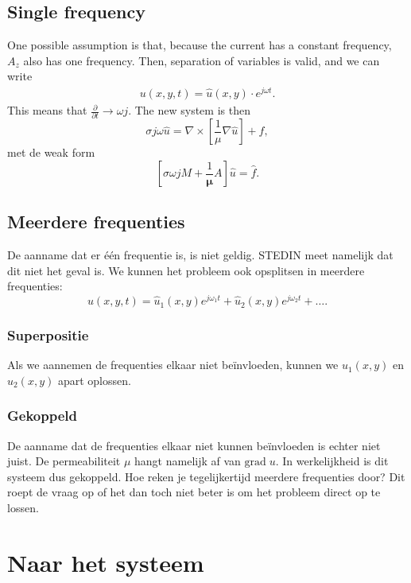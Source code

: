\subsection{Single frequency}
One possible assumption is that, because the current has a constant frequency, $A_z$ also has one frequency. 
Then, separation of variables is valid, and we can write
\begin{align*}
    u(x,y,t) = \hat u(x,y) \cdot e^{j\omega t}.
\end{align*}
This means that $\frac{\partial}{\partial t} \to \omega j$. The new system is then
\begin{equation}
    \sigma j \omega \hat u = \nabla \times \left[\frac{1}{\mu}\nabla \hat u\right] + f,
\end{equation}
met de weak form
\begin{equation*}
    \left[\sigma \omega j M + \frac{1}{\mathbf \mu}A\right]\hat u = \hat f.
\end{equation*}

\subsection{Meerdere frequenties}
De aanname dat er één frequentie is, is niet geldig. STEDIN meet namelijk dat dit niet het geval is. We kunnen het probleem ook opsplitsen in meerdere frequenties:
\begin{equation}
    u(x,y,t) = \hat u_1(x,y) e^{j\omega_1 t} + \hat u_2(x,y) e^{j\omega_2 t} + \dots.
\end{equation}

\subsubsection{Superpositie}
Als we aannemen de frequenties elkaar niet beïnvloeden, kunnen we $\hat u_1(x,y)$ en $\hat u_2(x,y)$ apart oplossen.

\subsubsection{Gekoppeld}
De aanname dat de frequenties elkaar niet kunnen beïnvloeden is echter niet juist. De permeabiliteit $\mu$ hangt namelijk af van $\text{grad} \; u$. In werkelijkheid is dit systeem dus gekoppeld. Hoe reken je tegelijkertijd meerdere frequenties door? Dit roept de vraag op of het dan toch niet beter is om het probleem direct op te lossen.

\section{Naar het systeem}

